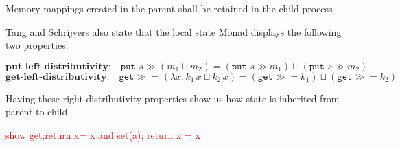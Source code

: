 \documentclass[logo,bsc,singlespacing,parskip]{infthesis}
\begin{document}
\begin{tcolorbox}[colback=gray!10, colframe=gray!60, sharp corners, boxrule=0.5pt, title={POSIX Base Specifications, Issue 7, p.897}]
Memory mappings created in the parent shall be retained in the child process
\end{tcolorbox}



Tang and Schrijvers \cite{tang2025high} also state that the local state Monad displays the following two properties:

\vspace{-1em}
\[
\textbf{put-left-distributivity:} \quad
\texttt{put } s \gg (m_1 \sqcup m_2) = (\texttt{put } s \gg m_1) \sqcup (\texttt{put } s \gg m_2)
\]
\vspace{-1em}
\[
\textbf{get-left-distributivity:} \quad
\texttt{get} \gg= (\lambda x.\, k_1\, x \sqcup k_2\, x) = (\texttt{get} \gg= k_1) \sqcup (\texttt{get} \gg= k_2) 
\]

Having these right distributivity properties show us how state is inherited from parent to child.



\textcolor{red}{show get;return x=  x and set(a); return x = x}
\end{document}
